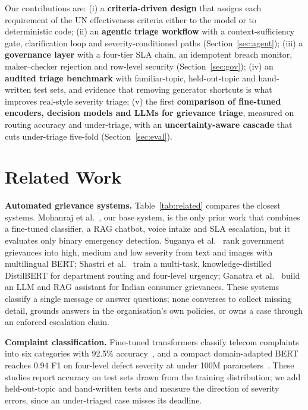 \documentclass[conference]{IEEEtran}
\begin{document}
\noindent Our contributions are:
(i) a \textbf{criteria-driven design} that assigns each requirement of the UN effectiveness criteria either to the
model or to deterministic code;
(ii) an \textbf{agentic triage workflow} with a context-sufficiency gate, clarification loop and
severity-conditioned paths (Section~\ref{sec:agent});
(iii) a \textbf{governance layer} with a four-tier SLA chain, an idempotent breach monitor, maker--checker rejection
and row-level security (Section~\ref{sec:gov});
(iv) an \textbf{audited triage benchmark} with familiar-topic, held-out-topic and hand-written test sets, and
evidence that removing generator shortcuts is what improves real-style severity triage;
(v) the first \textbf{comparison of fine-tuned encoders, decision models and LLMs for grievance triage}, measured on
routing accuracy and under-triage, with an \textbf{uncertainty-aware cascade} that cuts under-triage five-fold
(Section~\ref{sec:eval}).

\section{Related Work}

\textbf{Automated grievance systems.} Table~\ref{tab:related} compares the closest systems. Mohanraj et
al.~\cite{mohanraj2025railmadad}, our base system, is the only prior work that combines a fine-tuned classifier, a
RAG chatbot, voice intake and SLA escalation, but it evaluates only binary emergency detection. Suganya et
al.~\cite{suganya2025autonomous} rank government grievances into high, medium and low severity from text and images
with multilingual BERT; Shastri et al.~\cite{shastri2025aipca} train a multi-task, knowledge-distilled DistilBERT
for department routing and four-level urgency; Ganatra et al.~\cite{ganatra2025grahak} build an LLM and RAG
assistant for Indian consumer grievances. These systems classify a single message or answer questions; none
converses to collect missing detail, grounds answers in the organisation's own policies, or owns a case through an
enforced escalation chain.

\textbf{Complaint classification.} Fine-tuned transformers classify telecom complaints into six categories with
92.5\% accuracy~\cite{thayumanavan2025telecom}, and a compact domain-adapted BERT reaches 0.94 F1 on four-level
defect severity at under 100M parameters~\cite{chen2025lightweight}. These studies report
accuracy on test sets drawn from the training distribution; we add held-out-topic and hand-written tests and
measure the direction of severity errors, since an under-triaged case misses its deadline.
\end{document}
